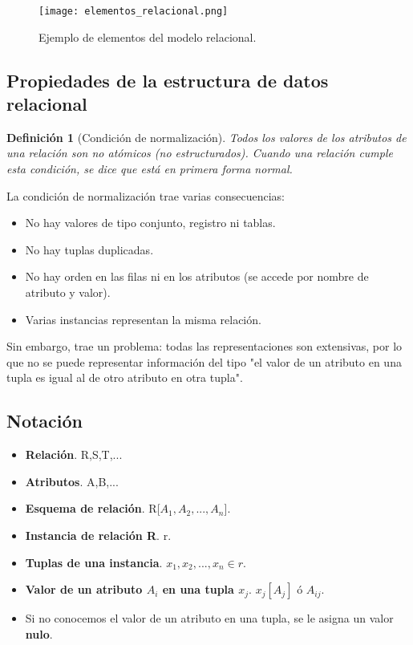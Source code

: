 \documentclass[12pt,spanish]{article}
\newtheorem{definition}{Definición}
\numberwithin{definition}{subsection}
\begin{document}
\begin{figure}[H]
\centering
\texttt{[image: elementos\_relacional.png]}
\caption{Ejemplo de elementos del modelo relacional.}
\end{figure}


\subsection{Propiedades de la estructura de datos relacional}

\begin{definition}[Condición de normalización]
	Todos los valores de los atributos de una relación son no atómicos (no estructurados). Cuando una relación cumple esta condición, se dice que está en \emph{primera forma normal}.
\end{definition}

La condición de normalización trae varias consecuencias:
\begin{itemize}
	\item No hay valores de tipo conjunto, registro ni tablas.
	\item No hay tuplas duplicadas.
	\item No hay orden en las filas ni en los atributos (se accede por nombre de atributo y valor).
	\item Varias instancias representan la misma relación.
\end{itemize}

Sin embargo, trae un problema: todas las representaciones son extensivas, por lo que no se puede representar información del tipo "el valor de un atributo en una tupla es igual al de otro atributo en otra tupla".

\subsection{Notación}

\begin{itemize}
	\item \textbf{Relación}. R,S,T,...
	\item \textbf{Atributos}. A,B,...
	\item \textbf{Esquema de relación}. R[$A_1,A_2,...,A_n$].
	\item \textbf{Instancia de relación R}. r.
	\item \textbf{Tuplas de una instancia}. $x_1,x_2,...,x_n \in r$.
	\item \textbf{Valor de un atributo $A_i$ en una tupla $x_j$}. $x_j[A_j]$ ó $A_{ij}$.
	\item Si no conocemos el valor de un atributo en una tupla, se le asigna un valor \textbf{nulo}.
\end{itemize}
\end{document}
